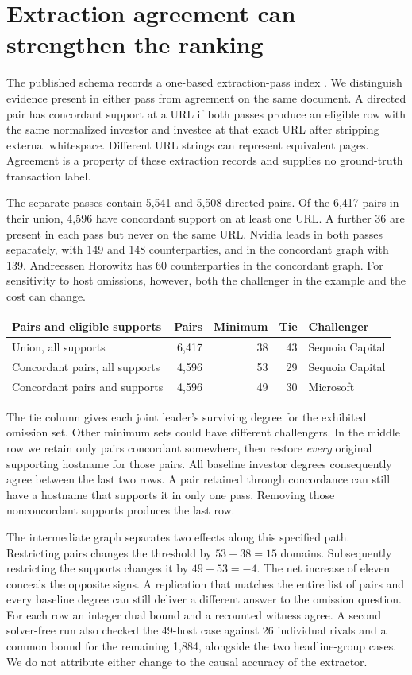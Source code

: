 \section{Extraction agreement can strengthen the ranking}
The published schema records a one-based extraction-pass index \cite{data}. We distinguish evidence present in either pass from agreement on the same document. A directed pair has concordant support at a URL if both passes produce an eligible row with the same normalized investor and investee at that exact URL after stripping external whitespace. Different URL strings can represent equivalent pages. Agreement is a property of these extraction records and supplies no ground-truth transaction label.

The separate passes contain 5,541 and 5,508 directed pairs. Of the 6,417 pairs in their union, 4,596 have concordant support on at least one URL. A further 36 are present in each pass but never on the same URL. Nvidia leads in both passes separately, with 149 and 148 counterparties, and in the concordant graph with 139. Andreessen Horowitz has 60 counterparties in the concordant graph. For sensitivity to host omissions, however, both the challenger in the example and the cost can change.

\begin{center}\small
\begin{tabular}{lrrrl}
\toprule
Pairs and eligible supports & Pairs & Minimum & Tie & Challenger\\
\midrule
Union, all supports & 6,417 & 38 & 43 & Sequoia Capital\\
Concordant pairs, all supports & 4,596 & 53 & 29 & Sequoia Capital\\
Concordant pairs and supports & 4,596 & 49 & 30 & Microsoft\\
\bottomrule
\end{tabular}
\end{center}
The tie column gives each joint leader's surviving degree for the exhibited omission set. Other minimum sets could have different challengers. In the middle row we retain only pairs concordant somewhere, then restore \emph{every} original supporting hostname for those pairs. All baseline investor degrees consequently agree between the last two rows. A pair retained through concordance can still have a hostname that supports it in only one pass. Removing those nonconcordant supports produces the last row.

The intermediate graph separates two effects along this specified path. Restricting pairs changes the threshold by $53-38=15$ domains. Subsequently restricting the supports changes it by $49-53=-4$. The net increase of eleven conceals the opposite signs. A replication that matches the entire list of pairs and every baseline degree can still deliver a different answer to the omission question. For each row an integer dual bound and a recounted witness agree. A second solver-free run also checked the 49-host case against 26 individual rivals and a common bound for the remaining 1,884, alongside the two headline-group cases. We do not attribute either change to the causal accuracy of the extractor.

